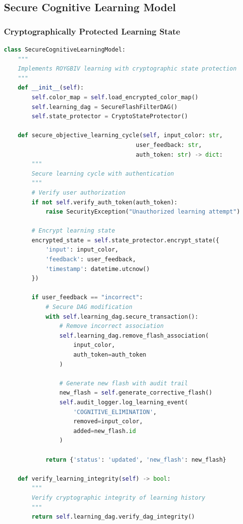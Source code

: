 \documentclass[12pt,a4paper]{article}
\begin{document}
\subsection{Secure Cognitive Learning Model}

\subsubsection{Cryptographically Protected Learning State}

\begin{lstlisting}[language=python, caption=Secure Cognitive Elimination]
class SecureCognitiveLearningModel:
    """
    Implements ROYGBIV learning with cryptographic state protection
    """
    def __init__(self):
        self.color_map = self.load_encrypted_color_map()
        self.learning_dag = SecureFlashFilterDAG()
        self.state_protector = CryptoStateProtector()
        
    def secure_objective_learning_cycle(self, input_color: str, 
                                      user_feedback: str,
                                      auth_token: str) -> dict:
        """
        Secure learning cycle with authentication
        """
        # Verify user authorization
        if not self.verify_auth_token(auth_token):
            raise SecurityException("Unauthorized learning attempt")
            
        # Encrypt learning state
        encrypted_state = self.state_protector.encrypt_state({
            'input': input_color,
            'feedback': user_feedback,
            'timestamp': datetime.utcnow()
        })
        
        if user_feedback == "incorrect":
            # Secure DAG modification
            with self.learning_dag.secure_transaction():
                # Remove incorrect association
                self.learning_dag.remove_flash_association(
                    input_color,
                    auth_token=auth_token
                )
                
                # Generate new flash with audit trail
                new_flash = self.generate_corrective_flash()
                self.audit_logger.log_learning_event(
                    'COGNITIVE_ELIMINATION',
                    removed=input_color,
                    added=new_flash.id
                )
                
            return {'status': 'updated', 'new_flash': new_flash}
            
    def verify_learning_integrity(self) -> bool:
        """
        Verify cryptographic integrity of learning history
        """
        return self.learning_dag.verify_dag_integrity()
\end{lstlisting}
\end{document}
